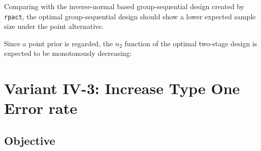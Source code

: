 \documentclass[
]{book}
\newenvironment{Shaded}{\begin{snugshade}}{\end{snugshade}}
\newcommand{\CommentTok}[1]{\textcolor[rgb]{0.56,0.35,0.01}{\textit{#1}}}
\newcommand{\DecValTok}[1]{\textcolor[rgb]{0.00,0.00,0.81}{#1}}
\newcommand{\KeywordTok}[1]{\textcolor[rgb]{0.13,0.29,0.53}{\textbf{#1}}}
\newcommand{\NormalTok}[1]{#1}
\newcommand{\OperatorTok}[1]{\textcolor[rgb]{0.81,0.36,0.00}{\textbf{#1}}}
\newcommand{\StringTok}[1]{\textcolor[rgb]{0.31,0.60,0.02}{#1}}
\begin{document}
Comparing with the inverse-normal based group-sequential design created
by \texttt{rpact}, the optimal group-sequential design should show
a lower expected sample size under the point alternative.

\begin{Shaded}
\end{Shaded}

Since a point prior is regarded, the \(n_2\) function of the optimal
two-stage design is expected to be monotonously decreasing:

\begin{Shaded}
\end{Shaded}

\hypertarget{variantIV_3}{%
\section{Variant IV-3: Increase Type One Error rate}\label{variantIV_3}}

\hypertarget{objective-9}{%
\subsection{Objective}\label{objective-9}}
\end{document}
